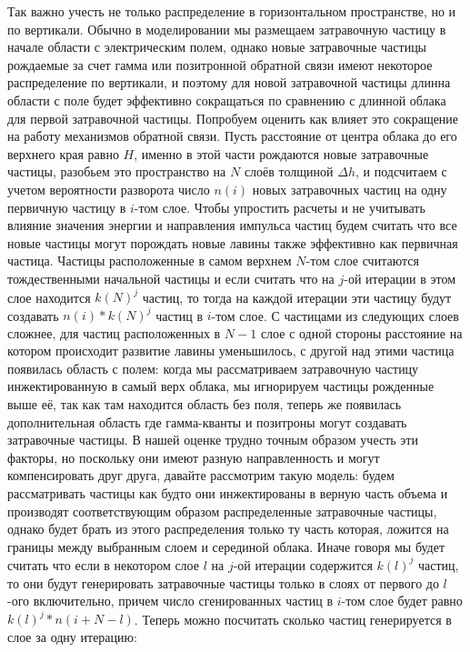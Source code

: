 Так важно учесть не только распределение в горизонтальном пространстве, но и по вертикали. Обычно в моделировании мы размещаем затравочную частицу в начале области с электрическим полем, однако новые затравочные частицы рождаемые за счет гамма или позитронной обратной связи имеют некоторое распределение по вертикали,  и поэтому для новой затравочной частицы длинна области с поле будет эффективно сокращаться по сравнению с длинной облака для первой затравочной частицы. Попробуем оценить как влияет это сокращение на работу механизмов обратной связи. Пусть расстояние от центра облака до его верхнего края равно $H$, именно в этой части рождаются новые затравочные частицы, разобьем это пространство на $N$ слоёв толщиной $\Delta h$, и подсчитаем с учетом вероятности разворота число $n(i)$ новых затравочных частиц на одну первичную частицу в $i$-том слое. Чтобы упростить расчеты и не учитывать влияние значения энергии и направления импульса частиц будем считать что все новые частицы могут порождать новые лавины также эффективно как первичная частица. Частицы расположенные в самом верхнем $N$-том слое считаются тождественными начальной частицы и если считать что на $j$-ой итерации в этом слое находится $k(N)^j$ частиц, то тогда на каждой итерации эти частицу будут создавать $n(i)*k(N)^j$ частиц в $i$-том слое. С частицами из следующих слоев сложнее, для частиц расположенных в $N-1$ слое с одной стороны расстояние на котором происходит развитие лавины уменьшилось, с другой над этими частица появилась область с полем: когда мы рассматриваем затравочную частицу инжектированную в самый верх облака, мы игнорируем частицы рожденные выше её, так как там находится область без поля, теперь же появилась дополнительная область где гамма-кванты и позитроны могут создавать затравочные частицы. В нашей оценке трудно точным образом учесть эти факторы, но поскольку они имеют разную направленность и могут компенсировать друг друга, давайте рассмотрим такую модель:  будем рассматривать частицы как будто они инжектированы в верную часть объема и производят соответствующим образом распределенные затравочные частицы, однако будет брать из этого распределения только ту часть которая, ложится на границы между выбранным слоем и серединой облака. Иначе говоря мы будет считать что если в некотором слое $l$ на $j$-ой итерации содержится $k(l)^j$ частиц, то они будут генерировать затравочные частицы только в слоях от первого до $l$-ого включительно, причем число сгенированных частиц в  $i$-том слое будет равно $k(l)^j * n(i+N-l)$. Теперь можно посчитать сколько частиц генерируется в слое за одну итерацию:
